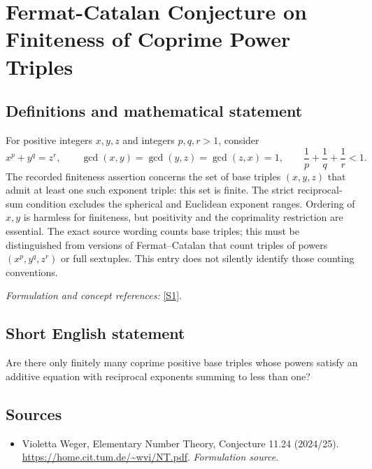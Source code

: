 \documentclass[11pt]{article}
\begin{document}
\section*{\texorpdfstring{Fermat-Catalan Conjecture on Finiteness of Coprime Power Triples}{Fermat-Catalan Conjecture on Finiteness of Coprime Power Triples}}\label{315}
\subsection{Definitions and mathematical statement}
For positive integers $x,y,z$ and integers $p,q,r>1$, consider
\[
 x^p+y^q=z^r,\qquad
 \gcd(x,y)=\gcd(y,z)=\gcd(z,x)=1,
 \qquad\frac1p+\frac1q+\frac1r<1.
\]
The recorded finiteness assertion concerns the set of base triples $(x,y,z)$ that admit at least one such exponent triple: this set is finite. The strict reciprocal-sum condition excludes the spherical and Euclidean exponent ranges. Ordering of $x,y$ is harmless for finiteness, but positivity and the coprimality restriction are essential. The exact source wording counts base triples; this must be distinguished from versions of Fermat--Catalan that count triples of powers $(x^p,y^q,z^r)$ or full sextuples. This entry does not silently identify those counting conventions.
\par\smallskip\textit{Formulation and concept references:} \href{https://home.cit.tum.de/~wvi/NT.pdf}{[S1]}.

\subsection{Short English statement}
Are there only finitely many coprime positive base triples whose powers satisfy an additive equation with reciprocal exponents summing to less than one?
\subsection{Sources}
\begin{itemize}
\item[S1]Violetta Weger, Elementary Number Theory, Conjecture 11.24 (2024/25).
\url{https://home.cit.tum.de/~wvi/NT.pdf}.
\textit{Formulation source.}
\end{itemize}
\end{document}
